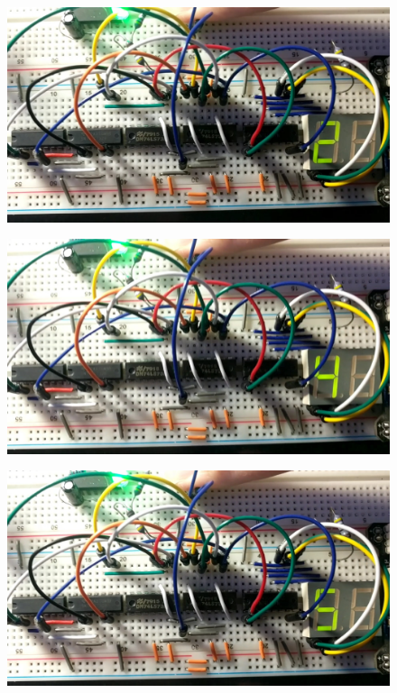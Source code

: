 \documentclass{article}
\begin{document}
\begin{figure}[ht!]
  \centering
  \includegraphics[width=\textwidth]{ECE2300L_Lab12_2.jpg}
\end{figure}
\begin{figure}[ht!]
  \centering
  \includegraphics[width=\textwidth]{ECE2300L_Lab12_4.jpg}
\end{figure}
\begin{figure}[ht!]
  \centering
  \includegraphics[width=\textwidth]{ECE2300L_Lab12_5.jpg}
\end{figure}
\end{document}
